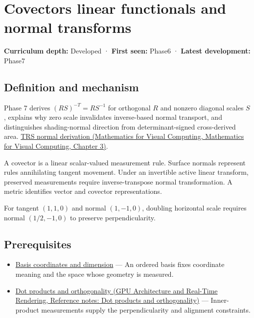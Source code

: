 \hypertarget{appendix-46da295c6787}{}\label{referencestart:appendix-46da295c6787}
\section{Covectors linear functionals and normal transforms}\label{appendix-46da295c6787-covectors-linear-functionals-and-normal-transforms}

\textbf{Curriculum depth:} Developed · \textbf{First seen:} Phase6 · \textbf{Latest development:} Phase7

\subsection{Definition and mechanism}\label{appendix-46da295c6787-definition-and-mechanism}

Phase 7 derives \((RS)^{-T}=RS^{-1}\) for orthogonal \(R\) and nonzero diagonal scales \(S\), explains why zero scale invalidates inverse-based normal transport, and distinguishes shading-normal direction from determinant-signed cross-derived area. \href{../02-Mathematics-for-Visual-Computing/main.pdf\#nameddest=01-foundations-i-ch019-normals-undo-scale-before-following-rotation}{TRS normal derivation (Mathematics for Visual Computing, Mathematics for Visual Computing, Chapter 3)}.

A covector is a linear scalar-valued measurement rule. Surface normals represent rules annihilating tangent movement. Under an invertible active linear transform, preserved measurements require inverse-transpose normal transformation. A metric identifies vector and covector representations.

For tangent \((1,1,0)\) and normal \((1,-1,0)\), doubling horizontal scale requires normal \((1/2,-1,0)\) to preserve perpendicularity.

\subsection{Prerequisites}\label{appendix-46da295c6787-prerequisites}

\begin{itemize}
\tightlist
\item
  \hyperref[appendix-ce0341f7ea0d]{Basis coordinates and dimension} --- An ordered basis fixes coordinate meaning and the space whose geometry is measured.
\item
  \href{../06-GPU-Architecture-and-Real-Time-Rendering/main.pdf\#nameddest=appendix-8bc4e8fc547c}{Dot products and orthogonality (GPU Architecture and Real-Time Rendering, Reference notes: Dot products and orthogonality)} --- Inner-product measurements supply the perpendicularity and alignment constraints.
\end{itemize}

